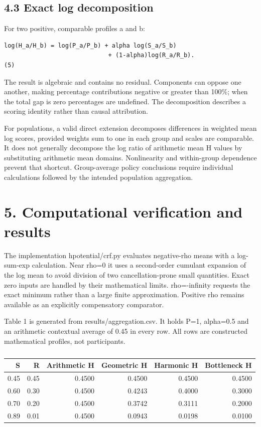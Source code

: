 \documentclass[11pt,a4paper]{article}
\begin{document}
\subsection*{4.3 Exact log decomposition}
For two positive, comparable profiles a and b:

{\footnotesize\begin{verbatim}
log(H_a/H_b) = log(P_a/P_b) + alpha log(S_a/S_b)
                             + (1-alpha)log(R_a/R_b).                 (5)
\end{verbatim}}
The result is algebraic and contains no residual. Components can oppose one another, making percentage contributions negative or greater than 100\%; when the total gap is zero percentages are undefined. The decomposition describes a scoring identity rather than causal attribution.

For populations, a valid direct extension decomposes differences in weighted mean log scores, provided weights sum to one in each group and scales are comparable. It does not generally decompose the log ratio of arithmetic mean H values by substituting arithmetic mean domains. Nonlinearity and within-group dependence prevent that shortcut. Group-average policy conclusions require individual calculations followed by the intended population aggregation.

\section*{5. Computational verification and results}
The implementation hpotential/crf.py evaluates negative-rho means with a log-sum-exp calculation. Near rho=0 it uses a second-order cumulant expansion of the log mean to avoid division of two cancellation-prone small quantities. Exact zero inputs are handled by their mathematical limits. rho=-infinity requests the exact minimum rather than a large finite approximation. Positive rho remains available as an explicitly compensatory comparator.

Table 1 is generated from results/aggregation.csv. It holds P=1, alpha=0.5 and an arithmetic contextual average of 0.45 in every row. All rows are constructed mathematical profiles, not participants.

\begin{table}[htbp]\centering\small
\caption{}
\begin{tabular}{rrrrrr}
\toprule
S & R & Arithmetic H & Geometric H & Harmonic H & Bottleneck H \\
\midrule
0.45 & 0.45 & 0.4500 & 0.4500 & 0.4500 & 0.4500 \\
0.60 & 0.30 & 0.4500 & 0.4243 & 0.4000 & 0.3000 \\
0.70 & 0.20 & 0.4500 & 0.3742 & 0.3111 & 0.2000 \\
0.89 & 0.01 & 0.4500 & 0.0943 & 0.0198 & 0.0100 \\
\bottomrule
\end{tabular}
\end{table}
\end{document}
